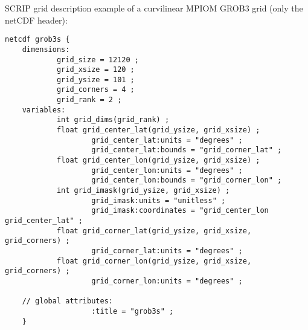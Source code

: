 SCRIP grid description example of a curvilinear MPIOM \cite{MPIOM} GROB3 grid (only the netCDF header):
\begin{lstlisting}[frame=single, backgroundcolor=\color{pcolor1}, basicstyle=\footnotesize]
    netcdf grob3s {
    dimensions:
            grid_size = 12120 ;
            grid_xsize = 120 ;
            grid_ysize = 101 ;
            grid_corners = 4 ;
            grid_rank = 2 ;
    variables:
            int grid_dims(grid_rank) ;
            float grid_center_lat(grid_ysize, grid_xsize) ;
                    grid_center_lat:units = "degrees" ;
                    grid_center_lat:bounds = "grid_corner_lat" ;
            float grid_center_lon(grid_ysize, grid_xsize) ;
                    grid_center_lon:units = "degrees" ;
                    grid_center_lon:bounds = "grid_corner_lon" ;
            int grid_imask(grid_ysize, grid_xsize) ;
                    grid_imask:units = "unitless" ;
                    grid_imask:coordinates = "grid_center_lon grid_center_lat" ;
            float grid_corner_lat(grid_ysize, grid_xsize, grid_corners) ;
                    grid_corner_lat:units = "degrees" ;
            float grid_corner_lon(grid_ysize, grid_xsize, grid_corners) ;
                    grid_corner_lon:units = "degrees" ;

    // global attributes:
                    :title = "grob3s" ;
    }
\end{lstlisting}





